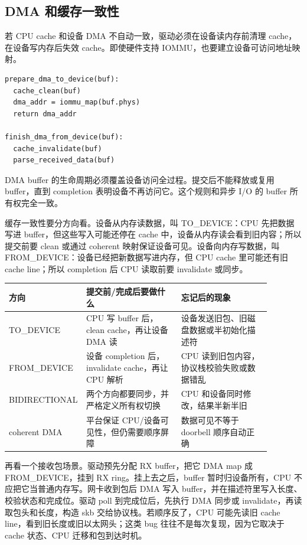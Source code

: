 \subsection{DMA 和缓存一致性}

若 CPU cache 和设备 DMA 不自动一致，驱动必须在设备读内存前清理 cache，在设备写内存后失效 cache。即使硬件支持 IOMMU，也要建立设备可访问地址映射。

\begin{lstlisting}
prepare_dma_to_device(buf):
  cache_clean(buf)
  dma_addr = iommu_map(buf.phys)
  return dma_addr

finish_dma_from_device(buf):
  cache_invalidate(buf)
  parse_received_data(buf)
\end{lstlisting}

DMA buffer 的生命周期必须覆盖设备访问全过程。提交后不能释放或复用 buffer，直到 completion 表明设备不再访问它。这个规则和异步 I/O 的 buffer 所有权完全一致。

缓存一致性要分方向看。设备从内存读数据，叫 TO\_DEVICE：CPU 先把数据写进 buffer，但这些写入可能还停在 cache 中，设备从内存读会看到旧内容；所以提交前要 clean 或通过 coherent 映射保证设备可见。设备向内存写数据，叫 FROM\_DEVICE：设备已经把新数据写进内存，但 CPU cache 里可能还有旧 cache line；所以 completion 后 CPU 读取前要 invalidate 或同步。

\begin{longtable}{|p{0.18\linewidth}|p{0.36\linewidth}|p{0.34\linewidth}|}
\toprule
方向 & 提交前/完成后要做什么 & 忘记后的现象 \\
\midrule
TO\_DEVICE & CPU 写 buffer 后，clean cache，再让设备 DMA 读 & 设备发送旧包、旧磁盘数据或半初始化描述符 \\\tablerowrule
FROM\_DEVICE & 设备 completion 后，invalidate cache，再让 CPU 解析 & CPU 读到旧包内容，协议栈校验失败或数据错乱 \\\tablerowrule
BIDIRECTIONAL & 两个方向都要同步，并严格定义所有权切换 & CPU 和设备同时修改，结果半新半旧 \\\tablerowrule
coherent DMA & 平台保证 CPU/设备可见性，但仍需要顺序屏障 & 数据可见不等于 doorbell 顺序自动正确 \\
\bottomrule
\end{longtable}

再看一个接收包场景。驱动预先分配 RX buffer，把它 DMA map 成 FROM\_DEVICE，挂到 RX ring。挂上去之后，buffer 暂时归设备所有，CPU 不应把它当普通内存写。网卡收到包后 DMA 写入 buffer，并在描述符里写入长度、校验状态和完成位。驱动 poll 到完成位后，先执行 DMA 同步或 invalidate，再读取包头和长度，构造 skb 交给协议栈。若顺序反了，CPU 可能先读旧 cache line，看到旧长度或旧以太网头；这类 bug 往往不是每次复现，因为它取决于 cache 状态、CPU 迁移和包到达时机。

